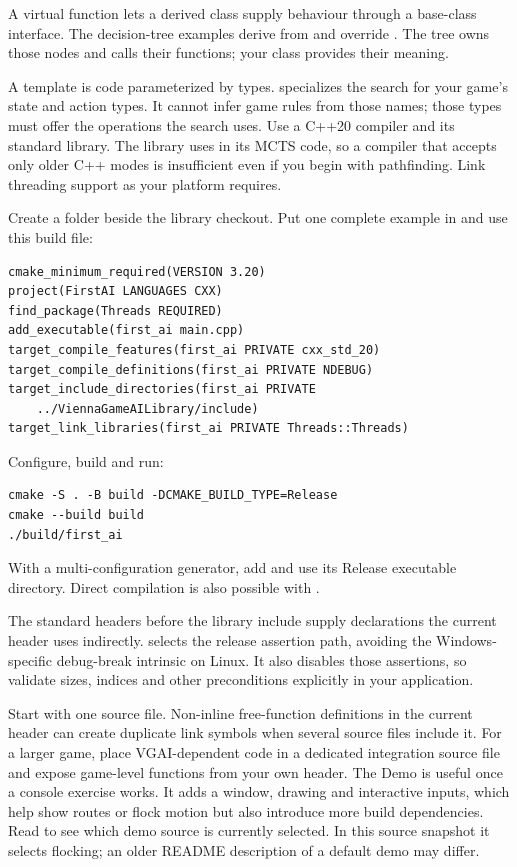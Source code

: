 \documentclass[11pt,a4paper]{article}
\begin{document}
A virtual function lets a derived class supply behaviour through a base-class interface. The decision-tree examples derive from  and override . The tree owns those nodes and calls their functions; your class provides their meaning.

A template is code parameterized by types.  specializes the search for your game's state and action types. It cannot infer game rules from those names; those types must offer the operations the search uses.
Use a C++20 compiler and its standard library. The library uses  in its MCTS code, so a compiler that accepts only older C++ modes is insufficient even if you begin with pathfinding. Link threading support as your platform requires.

Create a folder beside the library checkout. Put one complete example in  and use this build file:\begin{lstlisting}
cmake_minimum_required(VERSION 3.20)
project(FirstAI LANGUAGES CXX)
find_package(Threads REQUIRED)
add_executable(first_ai main.cpp)
target_compile_features(first_ai PRIVATE cxx_std_20)
target_compile_definitions(first_ai PRIVATE NDEBUG)
target_include_directories(first_ai PRIVATE
    ../ViennaGameAILibrary/include)
target_link_libraries(first_ai PRIVATE Threads::Threads)
\end{lstlisting}
Configure, build and run:\begin{lstlisting}
cmake -S . -B build -DCMAKE_BUILD_TYPE=Release
cmake --build build
./build/first_ai
\end{lstlisting}
With a multi-configuration generator, add  and use its Release executable directory. Direct compilation is also possible with .

The standard headers before the library include supply declarations the current header uses indirectly.  selects the release assertion path, avoiding the Windows-specific debug-break intrinsic on Linux. It also disables those assertions, so validate sizes, indices and other preconditions explicitly in your application.

Start with one source file. Non-inline free-function definitions in the current header can create duplicate link symbols when several source files include it. For a larger game, place VGAI-dependent code in a dedicated integration source file and expose game-level functions from your own header.
The Demo is useful once a console exercise works. It adds a window, drawing and interactive inputs, which help show routes or flock motion but also introduce more build dependencies. Read  to see which demo source is currently selected. In this source snapshot it selects flocking; an older README description of a default demo may differ.
\end{document}
